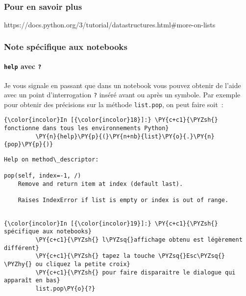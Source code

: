     \hypertarget{pour-en-savoir-plus}{%
\subsubsection{Pour en savoir plus}\label{pour-en-savoir-plus}}

    https://docs.python.org/3/tutorial/datastructures.html\#more-on-lists

    \hypertarget{note-spuxe9cifique-aux-notebooks}{%
\subsubsection{Note spécifique aux
notebooks}\label{note-spuxe9cifique-aux-notebooks}}

    \hypertarget{help-avec}{%
\paragraph{\texorpdfstring{\texttt{help} avec
\texttt{?}}{help avec ?}}\label{help-avec}}

    Je vous signale en passant que dans un notebook vous pouvez obtenir de
l'aide avec un point d'interrogation \texttt{?} inséré avant ou après un
symbole. Par exemple pour obtenir des précisions sur la méthode
\texttt{list.pop}, on peut faire soit~:

    \begin{Verbatim}[commandchars=\\\{\}]
{\color{incolor}In [{\color{incolor}18}]:} \PY{c+c1}{\PYZsh{} fonctionne dans tous les environnements Python}
         \PY{n}{help}\PY{p}{(}\PY{n+nb}{list}\PY{o}{.}\PY{n}{pop}\PY{p}{)}
\end{Verbatim}


    \begin{Verbatim}[commandchars=\\\{\}]
Help on method\_descriptor:

pop(self, index=-1, /)
    Remove and return item at index (default last).
    
    Raises IndexError if list is empty or index is out of range.


    \end{Verbatim}

    \begin{Verbatim}[commandchars=\\\{\}]
{\color{incolor}In [{\color{incolor}19}]:} \PY{c+c1}{\PYZsh{} spécifique aux notebooks}
         \PY{c+c1}{\PYZsh{} l\PYZsq{}affichage obtenu est légèrement différent}
         \PY{c+c1}{\PYZsh{} tapez la touche \PYZsq{}Esc\PYZsq{} \PYZhy{} ou cliquez la petite croix}
         \PY{c+c1}{\PYZsh{} pour faire disparaitre le dialogue qui apparaît en bas}
         list.pop\PY{o}{?}
\end{Verbatim}


